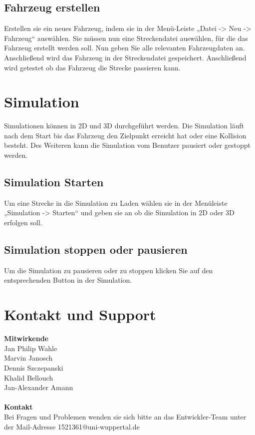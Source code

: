 \documentclass[11pt,a4paper]{article}
\begin{document}
\subsection{Fahrzeug erstellen}
Erstellen sie ein neues Fahrzeug, indem sie in der Menü-Leiste „Datei -> Neu -> Fahrzeug“ auswählen. Sie müssen nun eine Streckendatei auswählen, für die das Fahrzeug erstellt werden soll. Nun geben Sie alle relevanten Fahrzeugdaten an. Anschließend wird das Fahrzeug in der Streckendatei gespeichert. Anschließend wird getestet ob das Fahrzeug die Strecke passieren kann.
\newpage
\section{Simulation}
Simulationen können in 2D und 3D durchgeführt werden. Die Simulation läuft nach dem Start bis das Fahrzeug den Zielpunkt erreicht hat oder eine Kollision besteht.
Des Weiteren kann die Simulation vom Benutzer pausiert oder gestoppt werden.

\subsection{Simulation Starten}
Um eine Strecke in die Simulation zu Laden wählen sie in der Menüleiste „Simulation -> Starten“ und geben sie an ob die Simulation in 2D oder 3D erfolgen soll.
\subsection{Simulation stoppen oder pausieren}
Um die Simulation zu pausieren oder zu stoppen klicken Sie auf den entsprechenden Button in der Simulation.
\newpage
\section{Kontakt und Support}
\textbf{Mitwirkende} \\ 
Jan Philip Wahle \\
Marvin Janosch \\
Dennis Szczepanski \\
Khalid Bellouch \\
Jan-Alexander Amann \\
\\
\textbf{Kontakt} \\ 
Bei Fragen und Problemen wenden sie sich bitte an das Entwickler-Team unter der Mail-Adresse 1521361@uni-wuppertal.de
\end{document}
